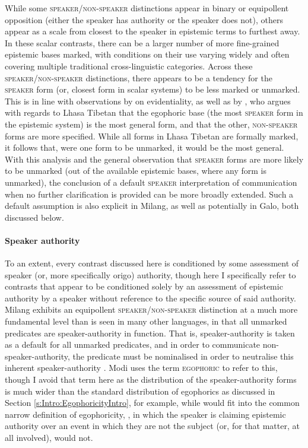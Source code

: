 While some \textsc{speaker}/\textsc{non-speaker} distinctions appear in binary or equipollent opposition (either the speaker has authority or the speaker does not), others appear as a scale from closest to the speaker in epistemic terms to furthest away. In these scalar contrasts, there can be a larger number of more fine-grained epistemic bases marked, with conditions on their use varying widely and often covering multiple traditional cross-linguistic categories. Across these \textsc{speaker}/\textsc{non-speaker} distinctions, there appears to be a tendency for the \textsc{speaker} form (or, closest form in scalar systems) to be less marked or unmarked. This is in line with observations by  on evidentiality, as well as by , who argues with regards to Lhasa Tibetan that the egophoric base (the most \textsc{speaker} form in the epistemic system) is the most general form, and that the other, \textsc{non-speaker} forms are more specified. While all forms in Lhasa Tibetan are formally marked, it follows that, were one form to be unmarked, it would be the most general. With this analysis and the general observation that \textsc{speaker} forms are more likely to be unmarked (out of the available epistemic bases, where any form is unmarked), the conclusion of a default \textsc{speaker} interpretation of communication when no further clarification is provided can be more broadly extended. Such a default assumption is also explicit in Milang, as well as potentially in Galo, both discussed below.

\paragraph{Speaker authority}
To an extent, every contrast discussed here is conditioned by some assessment of speaker (or, more specifically origo) authority, though here I specifically refer to contrasts that appear to be conditioned solely by an assessment of epistemic authority by a speaker without reference to the specific source of said authority.
Milang \cite[Siangic: India,][]{Modi2017} exhibits an equipollent \textsc{speaker}/\textsc{non-speaker} distinction at a much more fundamental level than is seen in many other languages, in that all unmarked predicates are speaker-authority in function. That is, speaker-authority is taken as a default for all unmarked predicates, and in order to communicate non-speaker-authority, the predicate must be nominalised in order to neutralise this inherent speaker-authority \cite[455]{Modi2017}. Modi uses the term \textsc{egophoric} to refer to this, though I avoid that term here as the distribution of the speaker-authority forms is much wider than the standard distribution of egophorics as discussed in Section \ref{s:Intro:EgophoricityIntro}, for example, while  would fit into the common narrow definition of egophoricity, , in which the speaker is claiming epistemic authority over an event in which they are not the subject (or, for that matter, at all involved), would not.

